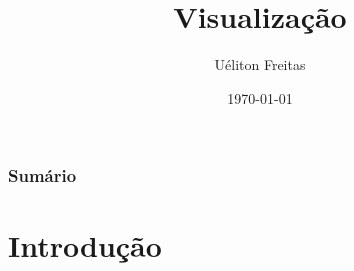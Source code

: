 \documentclass{beamer}
\title[Computação Gráfica]{Visualização} %
\author{Uéliton Freitas} %
\institute[UFMS] %
{
Universidade Católica Don Bosco - UCDB \\ %
\medskip
\textit{freitas.ueliton@gmail.com} %
}
\date{\today} %
\begin{document}
\begin{frame}
\titlepage %
\end{frame}

\begin{frame}
\frametitle{Sumário} %
\tableofcontents %
\end{frame}





\section{Introdução} 

\end{document}
